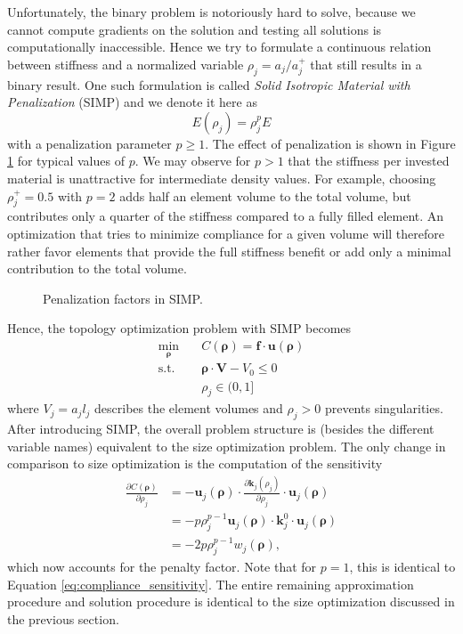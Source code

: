 Unfortunately, the binary problem is notoriously hard to solve, because we cannot compute gradients on the solution and testing all solutions is computationally inaccessible. Hence we try to formulate a continuous relation between stiffness and a normalized variable $\rho_j = a_j/a_j^+$ that still results in a binary result. One such formulation is called \emph{Solid Isotropic Material with Penalization} (SIMP) and we denote it here as 
\begin{equation}
    E(\rho_j)= \rho_j^p E
\end{equation}
with a penalization parameter $p \ge 1$. 
The effect of penalization is shown in Figure \ref{fig:simp_truss} for typical values of $p$. We may observe for $p>1$ that the stiffness per invested material is unattractive for intermediate density values. For example, choosing $\rho_j^+=0.5$ with $p=2$ adds half an element volume to the total volume, but contributes only a quarter of the stiffness compared to a fully filled element. An optimization that tries to minimize compliance for a given volume will therefore rather favor elements that provide the full stiffness benefit or add only a minimal contribution to the total volume.

\begin{figure}[!htpb]
    \centering
    
    \caption{Penalization factors in SIMP.}
    \label{fig:simp_truss}
\end{figure}

Hence, the topology optimization problem with SIMP becomes  
\begin{equation}
    \begin{aligned}
        \min_{\pmb{\rho}} \quad & C(\pmb{\rho}) = \mathbf{f} \cdot \mathbf{u}(\pmb{\rho})\\
        \textrm{s.t.} \quad & \pmb{\rho} \cdot \mathbf{V} - V_0 \le 0  \\
                            & \rho_j \in (0, 1]
    \end{aligned}
\end{equation}
where $V_j=a_j l_j$ describes the element volumes and $\rho_j >0$ prevents singularities. After introducing SIMP, the overall problem structure is (besides the different variable names) equivalent to the size optimization problem. The only change in comparison to size optimization  is the computation of the sensitivity
\begin{align}
    \frac{\partial C (\pmb{\rho})}{\partial \rho_j} 
    &= - \mathbf{u}_j (\pmb{\rho}) \cdot \frac{\partial \mathbf{k}_j(\rho_j)}{\partial \rho_j} \cdot \mathbf{u}_j (\pmb{\rho})  \\
    &= - p \rho_j^{p-1} \mathbf{u}_j (\pmb{\rho}) \cdot \mathbf{k}^0_j \cdot \mathbf{u}_j (\pmb{\rho})  \\
    &= - 2 p \rho_j^{p-1} w_j (\pmb{\rho}),
\end{align}
which now accounts for the penalty factor. Note that for $p=1$, this is identical to Equation \eqref{eq:compliance_sensitivity}. 
The entire remaining approximation procedure and solution procedure is identical to the size optimization discussed in the previous section.

